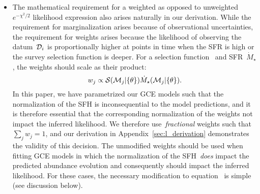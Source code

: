\documentclass[ms.tex]{subfiles}
\begin{document}
\begin{itemize}
	\item The mathematical requirement for a weighted as opposed to
	unweighted~$e^{-\chi^2/2}$ likelihood expression also arises naturally in
	our derivation.
	While the requirement for marginalization arises because of observational
	uncertainties, the requirement for weights arises because the likelihood of
	observing the datum~$\mathcal{D}_i$ is proportionally higher at points in
	time when the SFR is high or the survey selection function is deeper.
	For a selection function~ and SFR~$\dot{M}_\star$, the weights
	should scale as their product:
	\begin{equation}
	w_j \propto \mathcal{S}(\mathcal{M}_j | \{\theta\})
	\dot{M}_\star(\mathcal{M}_j | \{\theta\}).
	\label{eq:weights}
	\end{equation}
	In this paper, we have parametrized our GCE models such that the
	normalization of the SFH is inconsequential to the model predictions, and
	it is therefore essential that the corresponding normalization of the
	weights not impact the inferred likelihood.
	We therefore use~\textit{fractional} weights such that~$\sum_j w_j = 1$,
	and our derivation in Appendix~\ref{sec:l_derivation} demonstrates the
	validity of this decision.
	The unmodified weights should be used when fitting GCE models in which the
	normalization of the SFH~\textit{does} impact the predicted abundance
	evolution and consequently should impact the inferred likelihood.
	For these cases, the necessary modification to
	equation~ is simple (see discussion below).


\end{itemize}
\end{document}
